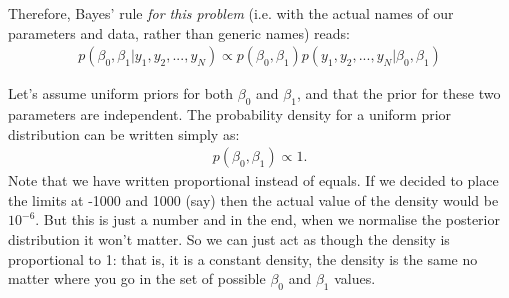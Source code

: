 Therefore, Bayes' rule {\it for this problem} (i.e. with the actual names
of our parameters and data, rather than generic names) reads:
\begin{eqnarray}
p(\beta_0, \beta_1 | y_1, y_2, ..., y_N) \propto
p(\beta_0, \beta_1)p(y_1, y_2, ..., y_N | \beta_0, \beta_1)
\end{eqnarray}

Let's assume uniform priors for both $\beta_0$ and $\beta_1$, and that the
prior for these two parameters are independent. The probability density for
a uniform prior distribution can be written simply as:
\begin{eqnarray}
p(\beta_0, \beta_1) \propto 1.
\end{eqnarray}
Note that we have written proportional instead of equals. If we decided to
place the limits at -1000 and 1000 (say) then the actual value of the density
would be $10^{-6}$. But this is just a number and in the end, when we normalise
the posterior distribution it won't matter. So we can just act as though the
density is proportional to 1: that is, it is a constant density, the density
is the same no matter where you go in the set of possible $\beta_0$ and $\beta_1$
values.


